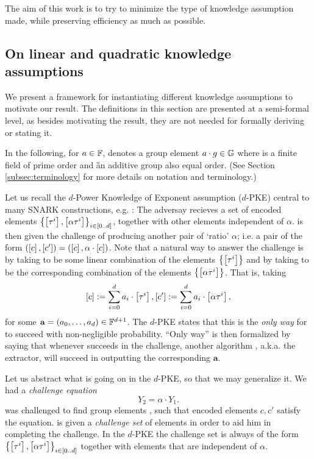 \documentclass[11pt]{article}
\numberwithin{figure}{section} %
\renewcommand{\a}{\ensuremath{\mathbf{a}}\xspace}
\newcommand{\X}{\ensuremath{\mathbf{X}}\xspace}
\newcommand{\set}[1]{\ensuremath{\left\{#1\right\}}\xspace}
\newcommand{\poly}{\ensuremath{\mathrm{poly}(\lambda)}\xspace}
\begin{document}
The aim of this work is to try to minimize the type of knowledge assumption made, while preserving efficiency as much as possible.
\subsection{On linear and quadratic knowledge assumptions}
We present a framework for instantiating different knowledge assumptions to motivate our result.
The definitions in this section are presented at a semi-formal level, as besides motivating the result, they are not needed for formally deriving or stating it.

In the following, for $a\in \mathbb F$,  denotes a group element $a\cdot g\in {\mathbb G}$
where \F is a finite field of prime order  and \G an additive group
also equal order. (See Section \ref{subsec:terminology} for more details on notation and terminology.)


Let us recall the $d$-Power Knowledge of Exponent assumption ($d$-PKE) central to many SNARK constructions, e.g. \cite{GGPR,PHGR}:
The adversay \adv recieves a set of encoded elements $\sett{\enc{\tau^i},\enc{\alpha \tau^i}}{i\in [0..d]}$,
together with other elements independent of $\alpha$.
\adv is then given the challenge of producing another pair of `ratio' $\alpha$; i.e. a pair of the form $(\left[c\right],\left[c'\right])= (\left[c\right],\alpha\cdot \left[c\right])$.
Note that a natural way to answer the challenge is by taking  to be some linear combination of the elements \set{\enc{\tau^i}} and by taking  to be the corresponding combination
of the elements \set{\enc{\alpha\tau^i}}.
That is, taking
\[\left[c\right]:= \sum_{i=0}^d a_i \cdot \left[\tau^i\right],\left[c'\right]:= \sum_{i=0}^d a_i \cdot \left[\alpha\tau^i\right],\]
for some $\a=(a_0,\ldots,a_d)\in \F^{d+1}$.
The $d$-PKE states that this is the \emph{only way} for \adv to succeed with non-negligible probability.
``Only way'' is then formalized by saying that whenever \adv succeeds in the challenge, another algorithm \ext, a.k.a. the extractor, will succeed in outputting the corresponding \a.

Let us abstract what is going on in the $d$-PKE, so that we may generalize it. 
We had a \emph{challenge equation}
\[Y_2=\alpha\cdot Y_1.\]
\adv was challenged to find group elements , such that encoded elements $c,c'$ satisfy the equation.
\adv is given a \emph{challenge set} of elements in order to aid him in completing the challenge.
In the $d$-PKE the challenge set is always of the form $\sett{\enc{\tau^i},\enc{\alpha \tau^i}}{i\in [0..d]}$ together with elements
that are independent of $\alpha$.
\end{document}
